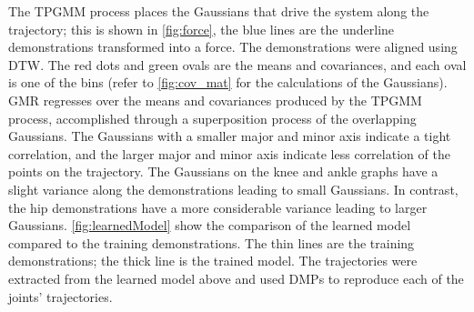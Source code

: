 The TPGMM process places the Gaussians that drive the system along the trajectory; this is shown in \autoref{fig:force}, the blue lines are the underline demonstrations transformed into a force. The demonstrations were aligned using DTW. The red dots and green ovals are the means and covariances, and each oval is one of the bins (refer to \autoref{fig:cov_mat} for the calculations of the Gaussians). GMR regresses over the means and covariances produced by the TPGMM process, accomplished through a superposition process of the overlapping Gaussians. The Gaussians with a smaller major and minor axis indicate a tight correlation, and the larger major and minor axis indicate less correlation of the points on the trajectory. The Gaussians on the knee and ankle graphs have a slight variance along the demonstrations leading to small Gaussians. In contrast, the hip demonstrations have a more considerable variance leading to larger Gaussians. \autoref{fig:learnedModel} show the comparison of the learned model compared to the training demonstrations. The thin lines are the training demonstrations; the thick line is the trained model. The trajectories were extracted from the learned model above and used DMPs to reproduce each of the joints' trajectories. 



